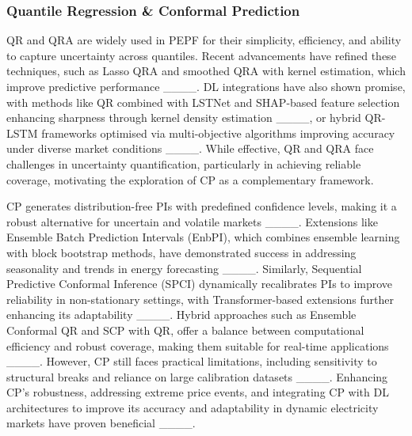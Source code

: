 \subsubsection*{Quantile Regression \& Conformal Prediction}
QR and QRA are widely used in PEPF for their simplicity, efficiency, and ability to capture uncertainty across quantiles. Recent advancements have refined these techniques, such as Lasso QRA and smoothed QRA with kernel estimation, which improve predictive performance ____. DL integrations have also shown promise, with methods like QR combined with LSTNet and SHAP-based feature selection enhancing sharpness through kernel density estimation ____, or hybrid QR-LSTM frameworks optimised via multi-objective algorithms improving accuracy under diverse market conditions ____. While effective, QR and QRA face challenges in uncertainty quantification, particularly in achieving reliable coverage, motivating the exploration of CP as a complementary framework.

CP generates distribution-free PIs with predefined confidence levels, making it a robust alternative for uncertain and volatile markets ____. Extensions like Ensemble Batch Prediction Intervals (EnbPI), which combines ensemble learning with block bootstrap methods, have demonstrated success in addressing seasonality and trends in energy forecasting ____. Similarly, Sequential Predictive Conformal Inference (SPCI) dynamically recalibrates PIs to improve reliability in non-stationary settings, with Transformer-based extensions further enhancing its adaptability ____. Hybrid approaches such as Ensemble Conformal QR and SCP with QR, offer a balance between computational efficiency and robust coverage, making them suitable for real-time applications ____.  However, CP still faces practical limitations, including sensitivity to structural breaks and reliance on large calibration datasets ____. Enhancing CP’s robustness, addressing extreme price events, and integrating CP with DL architectures to improve its accuracy and adaptability in dynamic electricity markets have proven beneficial ____.